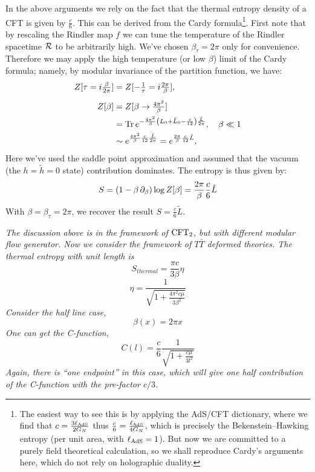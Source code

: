 \documentclass[11pt,a4paper]{article}
\begin{document}
	In the above arguments we rely on the fact that the thermal entropy density of a CFT is given by $
		\frac{c}{6}
	$. This can be derived from the Cardy formula\footnote{
		The easiest way to see this is by applying the AdS/CFT dictionary, where we find that $c = \frac{3\ell_{\mathrm{AdS}}}{2G_N}$ thus $\frac{c}{6} = \frac{\ell_{\mathrm{AdS}}}{4G_N}$, which is precisely the Bekenstein--Hawking entropy (per unit area, with $\ell_{\mathrm{AdS}} = 1$). But now we are committed to a purely field theoretical calculation, so we shall reproduce Cardy's arguments here, which do not rely on holographic duality. 
	}. First note that by rescaling the Rindler map $f$ we can tune the temperature of the Rindler spacetime $\mathcal{R}$ to be arbitrarily high. We've chosen $\beta_\tau = 2\pi$ only for convenience.  Therefore we may apply the high temperature (or low $\beta$) limit of the Cardy formula; namely, by modular invariance of the partition function, we have:
	\begin{equation}
	\begin{aligned}
		Z[\tau = i\tfrac{\beta}{2\pi}]
		&= Z[-\tfrac{1}{\tau} = i\tfrac{2\pi}{\beta}],
	\\[1ex]
		Z[\beta]
		&= Z[\beta\to \tfrac{4\pi^2}{\beta}] \\
		&= \Tr e^{
			-\frac{4\pi^2}{\beta} \pqty{
				L_0 + \tilde{L}_0 - \frac{c}{12}
			} \frac{\tilde{L}}{2\pi}
		}, \quad \beta\ll 1 \\
		&\sim e^{
			\frac{4\pi^2}{\beta}
			\frac{c}{12}
			\frac{\tilde{L}}{2\pi}
		}
		= e^{
			\frac{2\pi}{\beta}
			\frac{c}{12} \tilde{L}
		},
	\end{aligned}
	\end{equation}
	Here we've used the saddle point approximation and assumed that the vacuum (the $h = \tilde{h} = 0$ state) contribution dominates. The entropy is thus given by:
	\begin{equation}
		S = \pqty{
				1 - \beta\, \pdd{\beta}
			} \log Z[\beta]
		= \frac{2\pi}{\beta} \frac{c}{6} \tilde{L}
	\end{equation}
	With $\beta = \beta_\tau = 2\pi$, we recover the result $
		S = \frac{c}{6} \tilde{L}
	$. 
	
	
	
\pagebreak
\textit{
	The discussion above is in the framework of $\mathrm{CFT}_2$, but with different modular flow generator. Now we consider the framework of $T\bar{T}$ deformed theories. The thermal entropy with unit length is
	\begin{equation}
	S_{thermal}=\frac{\pi c}{3\beta}\eta
	\end{equation}
	\begin{equation}
	\eta=\frac{1}{\sqrt{1+\frac{4\pi^2c\mu}{3\beta^2}}}
	\end{equation}
	Consider the half line case,
	\begin{equation}
	\beta(x)=2\pi x
	\end{equation}
	One can get the C-function,
	\begin{equation}
	C(l)=\frac{c}{6}\frac{1}{\sqrt{1+\frac{c\mu}{3l^2}}}
	\end{equation}
	Again, there is ``one endpoint'' in this case, which will give one half contribution of the C-function with the pre-factor $c/3$.
}
	
\end{document}
